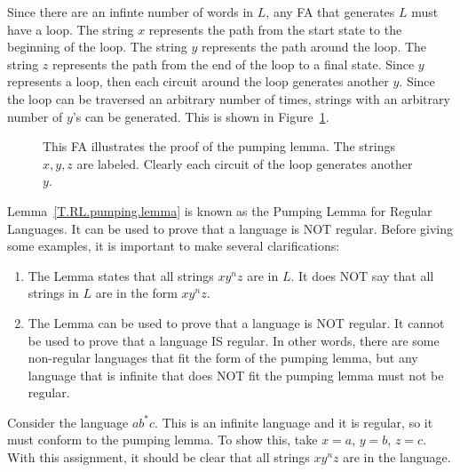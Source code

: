 \documentclass[letterpaper,12pt,openany,reqno]{book}%
\newcommand{\fanonterminalnode}[2] {\node at (#1) (#2) [circle, draw, minimum size=24pt] {#2};}
\newcommand{\fatransition}[3] {\draw [->] (#1) -- (#2) node [midway, above] {#3};}
\newcommand{\falooptop}[2] {\path (#1) edge [loop above] node {#2} ();}
\begin{document}
Since there are an infinte number of words in $L$, any FA that generates $L$ must have a loop. The string $x$ represents the path from the start state to the beginning of the loop. The string $y$ represents the path around the loop. The string $z$ represents the path from the end of the loop to a final state. Since $y$ represents a loop, then each circuit around the loop generates another $y$. Since the loop can be traversed an arbitrary number of times, strings with an arbitrary number of $y$'s can be generated. This is shown in Figure~\ref{F.RL.pumping.lemma}.

\begin{figure}[hbt]
\centering
{}
\caption[FA illustrating the pumping lemma]{This FA illustrates the proof of the pumping lemma. The strings $x,y,z$ are labeled. Clearly each circuit of the loop generates another $y$.}
\label{F.RL.pumping.lemma}
\end{figure}


Lemma~\ref{T.RL.pumping.lemma} is known as the Pumping Lemma for Regular Languages. It can be used to prove that a language is NOT regular. Before giving some examples, it is important to make several clarifications:
\begin{enumerate}
\item The Lemma states that all strings $x y^n z$ are in $L$. It does NOT say that all strings in $L$ are in the form $x y^n z$.
\item The Lemma can be used to prove that a language is NOT regular. It cannot be used to prove that a language IS regular. In other words, there are some non-regular languages that fit the form of the pumping lemma, but any language that is infinite that does NOT fit the pumping lemma must not be regular.
\end{enumerate}

Consider the language $ab^*c$. This is an infinite language and it is regular, so it must conform to the pumping lemma. To show this, take $x=a$, $y=b$, $z=c$. With this assignment, it should be clear that all strings $xy^n z$ are in the language.
\end{document}

